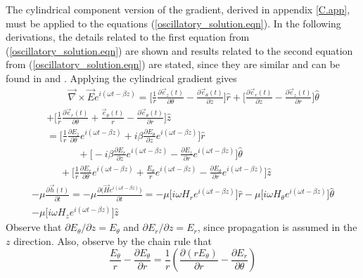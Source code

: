 \documentclass[12pt]{article}
\theoremstyle{definition}
\numberwithin{equation}{section}
\begin{document}
{The cylindrical component version of the gradient, derived in appendix \ref{C.app}, must be applied to the equations (\ref{oscillatory_solution.eqn}). In the following derivations, the details related to the first equation from (\ref{oscillatory_solution.eqn}) are shown and results related to the second equation from (\ref{oscillatory_solution.eqn}) are stated, since they are similar and can be found in \cite{Belanger} and \cite{Okamoto}. Applying the cylindrical gradient gives
\begin{multline}
\quad\quad\,\vec{\nabla}\times\vec{E}e^{i(\omega t-\beta z)} = \bigg[\frac{1}{r}\frac{\partial\vec{e}_{z}(t)}{\partial\theta}-\frac{\partial\vec{e}_{\theta}(t)}{\partial z}\bigg]\hat{r}+\bigg[\frac{\partial\vec{e}_{r}(t)}{\partial z}-\frac{\partial\vec{e}_{z}(t)}{\partial r}\bigg]\hat{\theta}\\
+\bigg[\frac{1}{r}\frac{\partial\vec{e}_{r}(t)}{\partial\theta}+\frac{\vec{e}_{\theta}(t)}{r}-\frac{\partial\vec{e}_{\theta}(t)}{\partial r}\bigg]\hat{z}\\
=\bigg[\frac{1}{r}\frac{\partial E_z}{\partial\theta}e^{i(\omega t-\beta z)}+i\beta\frac{\partial E_{\theta}}{\partial z}e^{i(\omega t-\beta z)}\bigg]\hat{r}\\
\qquad\quad\, +\bigg[-i\beta\frac{\partial E_r}{\partial z}e^{i(\omega t-\beta z)}-\frac{\partial E_z}{\partial r}e^{i(\omega t-\beta z)}\bigg]\hat{\theta}\\
\,\,\quad+\bigg[\frac{1}{r}\frac{\partial E_r}{\partial\theta}e^{i(\omega t-\beta z)}+\frac{E_{\theta}}{r}e^{i(\omega t-\beta z)}-\frac{\partial E_{\theta}}{\partial r}e^{i(\omega t-\beta z)}\bigg]\hat{z}
\label{guides1.eqn}
\end{multline}
\begin{multline}
-\mu\frac{\partial\vec{h}(t)}{\partial t}=-\mu\frac{\partial\big(\vec{H}e^{i(\omega t-\beta z)}\big)}{\partial t}=-\mu\bigg[ i\omega H_{r}e^{i(\omega t-\beta z)}\bigg]\hat{r}-\mu\bigg[i\omega H_{\theta}e^{i(\omega t-\beta z)}\bigg]\hat{\theta}\\
-\mu\bigg[ i\omega H_{z}e^{i(\omega t-\beta z)}\bigg]\hat{z}\label{guides2.eqn}
\end{multline}
Observe that $\partial E_\theta\slash\partial z=E_\theta$ and $\partial E_r\slash\partial z=E_r$, since propagation is assumed in the $z$ direction. Also, observe by the chain rule that
$$\frac{E_\theta}{r}-\frac{\partial E_\theta}{\partial r}=\frac{1}{r}\left(\frac{\partial (rE_{\theta})}{\partial r} -\frac{\partial E_r}{\partial\theta}\right)$$

}
\end{document}
